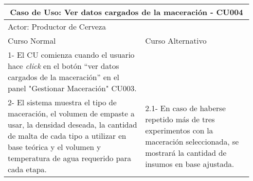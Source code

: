     \begin{table}[H]
    \begin{center}
    \begin{tabularx}{\textwidth}{ | X | X |}
        \hline
        \multicolumn{2}{|c|}{\textbf{Caso de Uso: Ver datos cargados de la maceración - CU004}} \\
        \hline
        \multicolumn{2}{|l|}{Actor: Productor de Cerveza} \\
        \hline
        Curso Normal & Curso Alternativo \\
        \hline
        1- El CU comienza cuando el usuario hace \textit{click} en el botón “ver datos cargados de la maceración” en el panel "Gestionar Maceración" CU003. & \\
        \hline
        2- El sistema muestra el tipo de maceración, el volumen de empaste a usar, la densidad deseada, la cantidad de malta de cada tipo a utilizar en base teórica y el volumen y temperatura de agua requerido para cada etapa. & 2.1- En caso de haberse repetido más de tres experimentos con la maceración seleccionada, se mostrará la cantidad de insumos en base ajustada. \\
        \hline
        
    \end{tabularx}
    \label{CU004}
    \end{center}
    \end{table}
    
    

